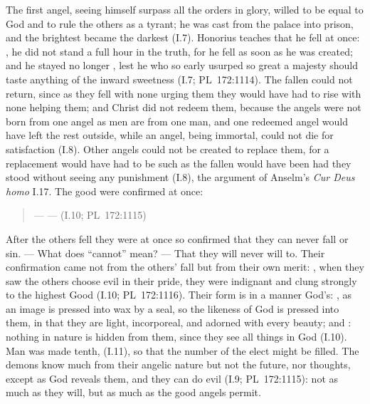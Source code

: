 The first angel, seeing himself surpass all the orders in glory, willed to
be equal to God and to rule the others as a tyrant; he was cast from the
palace into prison, and the brightest became the darkest (I.7). Honorius
teaches that he fell at once: , he did not stand a full hour in the truth,
for he fell as soon as he was created; and he stayed no longer , lest he who so early usurped so great a majesty
should taste anything of the inward sweetness (I.7; PL~172:1114). The fallen could not
return, since as they fell with none urging them they would have had to
rise with none helping them; and Christ did not redeem them, because the
angels were not born from one angel as men are from one man, and one
redeemed angel would have left the rest outside, while an angel, being
immortal, could not die for satisfaction (I.8). Other angels could not be
created to replace them, for a replacement would have had to be such as
the fallen would have been had they stood without seeing any punishment
(I.8), the argument of Anselm's \emph{Cur Deus homo} I.17. The good were
confirmed at once:

\begin{quote}
 ---  ---  (I.10; PL~172:1115)
\end{quote}

\noindent After the others fell they were at once so confirmed that they can
never fall or sin. --- What does ``cannot'' mean? --- That they will never
will to. Their confirmation came not from the others' fall but from their
own merit: , when they saw the
others choose evil in their pride, they were indignant and clung strongly
to the highest Good (I.10; PL~172:1116). Their form is in a manner God's:
, as an image is pressed into wax by a seal, so the likeness of
God is pressed into them, in that they are light, incorporeal, and adorned
with every beauty; and : nothing in nature is hidden from them, since
they see all things in God (I.10). Man was made tenth,  (I.11), so that the number of the elect
might be filled. The demons know much from their angelic nature but not the
future, nor thoughts, except as God reveals them, and they can do evil
 (I.9; PL~172:1115): not as much as they will, but as much as
the good angels permit.

